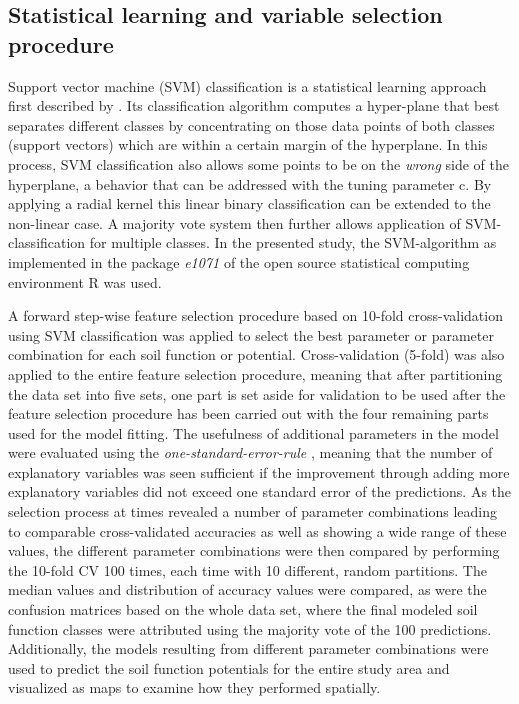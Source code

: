 \documentclass[soilsystems,article,submit,moreauthors,pdftex,10pt,a4paper]{Definitions/mdpi}
\begin{document}
\subsection{Statistical learning and variable selection procedure}
Support vector machine (SVM) classification is a statistical learning approach first described by \cite{Cortes1995}. Its classification algorithm computes a hyper-plane that best separates different classes by concentrating on those data points of both classes (support vectors) which are within a certain margin of the hyperplane. In this process, SVM classification also allows some points to be on the \emph{wrong} side of the hyperplane, a behavior that can be addressed with the tuning parameter c.  By applying a radial kernel this linear binary classification can be extended to the non-linear case. A majority vote system then further allows application of SVM-classification for multiple classes. In the presented study, the SVM-algorithm as implemented in the package \emph{e1071} \citep{Meyer2014} of the open source statistical computing environment R \citep{cran2014} was used.

A forward step-wise feature selection procedure based on 10-fold cross-validation using SVM classification was applied to select the best parameter or parameter combination for each soil function or potential. Cross-validation  (5-fold) was also applied to the entire feature selection procedure, meaning that after partitioning the data set into five sets, one part is set aside for validation to be used after the feature selection procedure has been carried out with the four remaining parts used for the model fitting. The usefulness of additional parameters in the model were evaluated using the \emph{one-standard-error-rule} \citep{James2013}, meaning that the number of explanatory variables was seen sufficient if the improvement through adding more explanatory variables did not exceed one standard error of the predictions. As the selection process at times revealed a number of parameter combinations leading to comparable cross-validated accuracies as well as showing a wide range of these values, the different parameter combinations were then compared by performing the 10-fold CV 100 times, each time with 10 different, random partitions. The median values and distribution of accuracy values were compared, as were the confusion matrices based on the whole data set, where the final modeled soil function classes were attributed using the majority vote of the 100 predictions.  Additionally, the models resulting from different parameter combinations  were used to predict the soil function potentials for the entire study area and visualized as maps to examine how they performed spatially.
\end{document}

